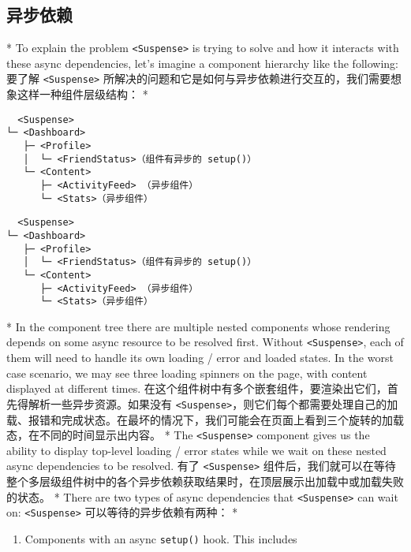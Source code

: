 \begin{paracol}{2}
\subsection{异步依赖}
\switchcolumn[0]*%
To explain the problem \texttt{\textless{}Suspense\textgreater{}} is
trying to solve and how it interacts with these async dependencies,
let's imagine a component hierarchy like the following:
\switchcolumn
要了解 \texttt{\textless{}Suspense\textgreater{}}
所解决的问题和它是如何与异步依赖进行交互的，我们需要想象这样一种组件层级结构：
\switchcolumn[0]*%
\begin{verbatim}
  <Suspense>
└─ <Dashboard>
   ├─ <Profile>
   │  └─ <FriendStatus>（组件有异步的 setup()）
   └─ <Content>
      ├─ <ActivityFeed> （异步组件）
      └─ <Stats>（异步组件）
\end{verbatim}
\switchcolumn
\begin{verbatim}
  <Suspense>
└─ <Dashboard>
   ├─ <Profile>
   │  └─ <FriendStatus>（组件有异步的 setup()）
   └─ <Content>
      ├─ <ActivityFeed> （异步组件）
      └─ <Stats>（异步组件）
\end{verbatim}
\switchcolumn[0]*%
In the component tree there are multiple nested components whose
rendering depends on some async resource to be resolved first. Without
\texttt{\textless{}Suspense\textgreater{}}, each of them will need to
handle its own loading / error and loaded states. In the worst case
scenario, we may see three loading spinners on the page, with content
displayed at different times.
\switchcolumn
在这个组件树中有多个嵌套组件，要渲染出它们，首先得解析一些异步资源。如果没有
\texttt{\textless{}Suspense\textgreater{}}，则它们每个都需要处理自己的加载、报错和完成状态。在最坏的情况下，我们可能会在页面上看到三个旋转的加载态，在不同的时间显示出内容。
\switchcolumn[0]*%
The \texttt{\textless{}Suspense\textgreater{}} component gives us the
ability to display top-level loading / error states while we wait on
these nested async dependencies to be resolved.
\switchcolumn
有了 \texttt{\textless{}Suspense\textgreater{}}
组件后，我们就可以在等待整个多层级组件树中的各个异步依赖获取结果时，在顶层展示出加载中或加载失败的状态。
\switchcolumn[0]*%
There are two types of async dependencies that
\texttt{\textless{}Suspense\textgreater{}} can wait on:
\switchcolumn
\texttt{\textless{}Suspense\textgreater{}} 可以等待的异步依赖有两种：
\switchcolumn[0]*%
\begin{enumerate}
\item
  Components with an async \texttt{setup()} hook. This includes

\end{enumerate}
\end{paracol}
